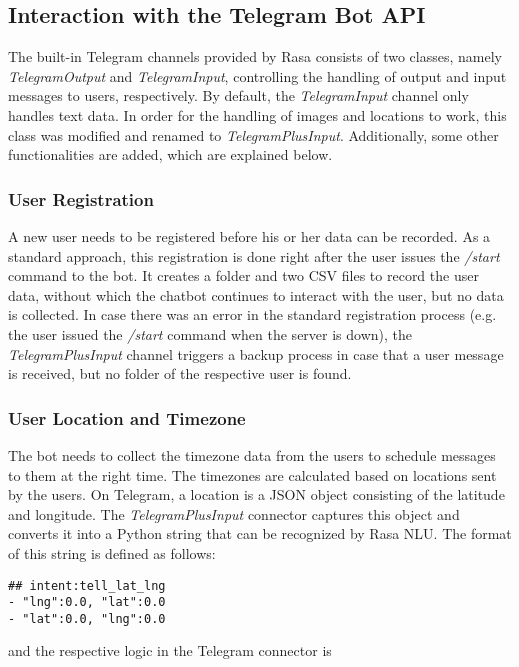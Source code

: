 \subsection{Interaction with the Telegram Bot API}
The built-in Telegram channels provided by Rasa consists of two classes, namely \emph{TelegramOutput} and \emph{TelegramInput}, controlling the handling of output and input messages to users, respectively. By default, the \emph{TelegramInput} channel only handles text data. In order for the handling of images and locations to work, this class was modified and renamed to \emph{TelegramPlusInput}. Additionally, some other functionalities are added, which are explained below.

\subsubsection{User Registration}
A new user needs to be registered before his or her data can be recorded. As a standard approach, this registration is done right after the user issues the \emph{/start} command to the bot. It creates a folder and two CSV files to record the user data, without which the chatbot continues to interact with the user, but no data is collected. In case there was an error in the standard registration process (e.g. the user issued the \emph{/start} command when the server is down), the \emph{TelegramPlusInput} channel triggers a backup process in case that a user message is received, but no folder of the respective user is found.

\subsubsection{User Location and Timezone}
The bot needs to collect the timezone data from the users to schedule messages to them at the right time. The timezones are calculated based on locations sent by the users. On Telegram, a location is a JSON object consisting of the latitude and longitude. The \emph{TelegramPlusInput} connector captures this object and converts it into a Python string that can be recognized by Rasa NLU. The format of this string is defined as follows:

\begin{lstlisting}
## intent:tell_lat_lng
- "lng":0.0, "lat":0.0
- "lat":0.0, "lng":0.0
\end{lstlisting}

\bigskip
and the respective logic in the Telegram connector is

